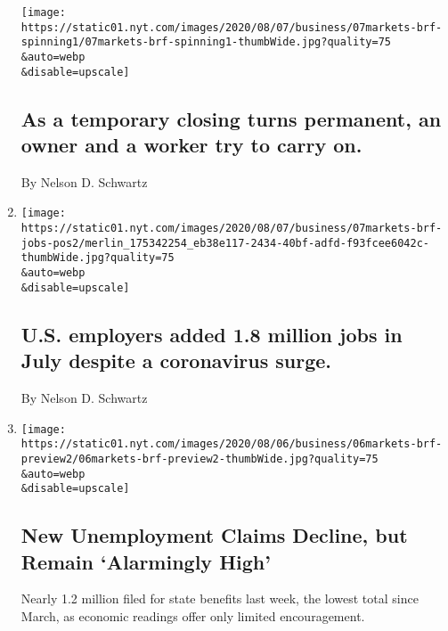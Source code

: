 \begin{enumerate}
  \texttt{[image: https://static01.nyt.com/images/2020/08/07/business/07markets-brf-spinning1/07markets-brf-spinning1-thumbWide.jpg?quality=75\\\&auto=webp\\\&disable=upscale]}

  \hypertarget{as-a-temporary-closing-turns-permanent-an-owner-and-a-worker-try-to-carry-on}{%
  \subsection{As a temporary closing turns permanent, an owner and a
  worker try to carry
  on.}\label{as-a-temporary-closing-turns-permanent-an-owner-and-a-worker-try-to-carry-on}}

  By Nelson D. Schwartz
\item
  \href{/live/2020/08/07/business/stock-market-today-coronavirus/us-employers-added-1-8-million-jobs-in-july-despite-a-coronavirus-surge}{}

  \texttt{[image: https://static01.nyt.com/images/2020/08/07/business/07markets-brf-jobs-pos2/merlin\_175342254\_eb38e117-2434-40bf-adfd-f93fcee6042c-thumbWide.jpg?quality=75\\\&auto=webp\\\&disable=upscale]}

  \hypertarget{us-employers-added-18-million-jobs-in-july-despite-a-coronavirus-surge}{%
  \subsection{U.S. employers added 1.8 million jobs in July despite a
  coronavirus
  surge.}\label{us-employers-added-18-million-jobs-in-july-despite-a-coronavirus-surge}}

  By Nelson D. Schwartz
\item
  \href{/2020/08/06/business/economy/unemployment-claims.html}{}

  \texttt{[image: https://static01.nyt.com/images/2020/08/06/business/06markets-brf-preview2/06markets-brf-preview2-thumbWide.jpg?quality=75\\\&auto=webp\\\&disable=upscale]}

  \hypertarget{new-unemployment-claims-decline-but-remain-alarmingly-high}{%
  \subsection{New Unemployment Claims Decline, but Remain `Alarmingly
  High'}\label{new-unemployment-claims-decline-but-remain-alarmingly-high}}

  Nearly 1.2 million filed for state benefits last week, the lowest
  total since March, as economic readings offer only limited
  encouragement.


\end{enumerate}
